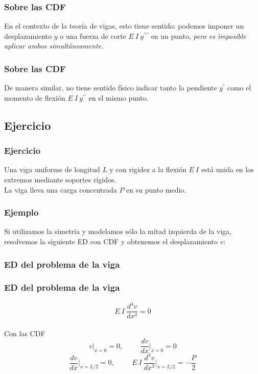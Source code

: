 \begin{frame}
\frametitle{Sobre las CDF}
En el contexto de la teoría de vigas, esto tiene sentido: podemos imponer un desplazamiento $y$ o una fuerza de corte $E \: I \: y^{\prime \prime \prime}$ en un punto, \emph{pero es imposible aplicar ambos simultáneamente}.
\end{frame}
\begin{frame}
\frametitle{Sobre las CDF}
De manera similar, no tiene sentido físico indicar tanto la pendiente $y^{\prime}$ como el momento de flexión $E \: I \: y^{\prime \prime}$ en el mismo punto.	
\end{frame}
\subsection{Ejercicio}
\begin{frame}
\frametitle{Ejercicio}
Una viga uniforme de longitud $L$ y con rigidez a la flexión $E \: I$ está unida en los extremos mediante soportes rígidos.
\\
\bigskip
La viga lleva una carga concentrada $P$ en su punto medio.
\begin{figure}
	\centering
	
\end{figure}
\end{frame}
\begin{frame}
\frametitle{Ejemplo}
\begin{figure}
	\centering
	
\end{figure}
Si utilizamos la simetría y modelamos sólo la mitad izquierda de la viga, resolvemos la siguiente ED con CDF y obtenemos el desplazamiento $v$:
\end{frame}
\subsubsection{ED del problema de la viga}
\begin{frame}
\frametitle{ED del problema de la viga}
\[ E \: I \: \dfrac{d^{4} v}{d x^{4}} = 0 \]
\\
Con las CDF
\[v \vert_{x = 0} = 0, \hspace{1cm} \dfrac{d v}{d x} \bigg\vert_{x = 0} = 0 \]
\[ \dfrac{d v}{d x} \bigg\vert_{x = L/2} = 0, \hspace{1cm} E \: I \: \dfrac{d^{3} v}{d x^{3}} \bigg\vert_{x = L/2} = - \dfrac{P}{2} \]
\end{frame}
